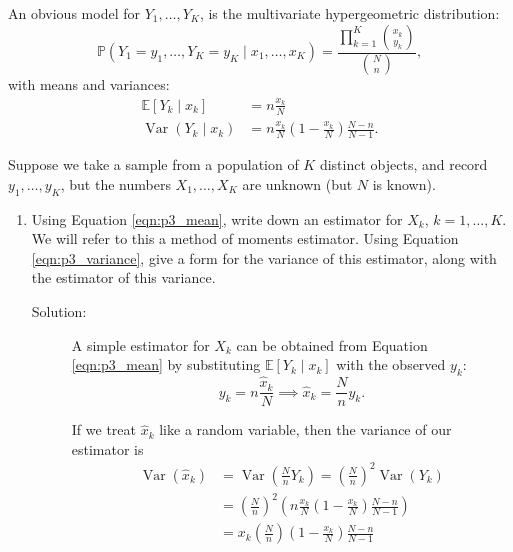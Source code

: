 \documentclass[letterpaper,11pt]{article}
\begin{document}
\begin{enumerate}
    An obvious model for $Y_1,\ldots,Y_K$, is the multivariate hypergeometric
    distribution:
    \begin{equation}
      \mathbb{P}\left(Y_1 = y_1,\ldots,Y_K=y_K \mid x_1,\ldots,x_K\right) =
      \frac{\prod_{k=1}^K{x_k \choose y_k}}{{N \choose n}},
      \label{eqn:p3_hypergeometric}
    \end{equation}
    with means and variances:
    \begin{align}
      \mathbb{E}\left[Y_k \mid x_k\right]
      &= n\frac{x_k}{N} \label{eqn:p3_mean}\\
      \operatorname{Var}\left(Y_k \mid x_k\right)
      &= n\frac{x_k}{N}\left(1 - \frac{x_k}{N}\right)\frac{N-n}{N-1}.
        \label{eqn:p3_variance}
    \end{align}

    Suppose we take a sample from a population of $K$ distinct objects, and
    record $y_1,\ldots,y_K$, but the numbers $X_1,\ldots,X_K$ are unknown (but
    $N$ is known).
    \begin{enumerate}
    \item Using Equation \ref{eqn:p3_mean}, write down an estimator for $X_k$,
      $k = 1,\ldots,K$. We will refer to this a method of moments
      estimator. Using Equation \ref{eqn:p3_variance}, give a form for the
      variance of this estimator, along with the estimator of this variance.

      \begin{description}
      \item[Solution:] A simple estimator for $X_k$ can be obtained from
        Equation \ref{eqn:p3_mean} by substituting
        $\mathbb{E}\left[Y_k \mid x_k\right]$ with the observed $y_k$:
        \begin{equation}
          y_k = n\frac{\hat{x}_k}{N} \implies \hat{x}_k = \frac{N}{n}y_k.
          \label{eqn:p3_xk_method_of_moments}
        \end{equation}

        If we treat $\hat{x}_k$ like a random variable, then the variance of our
        estimator is
        \begin{align}
          \operatorname{Var}\left(\hat{x}_k\right)
          &= \operatorname{Var}\left(\frac{N}{n}Y_k\right)
            = \left(\frac{N}{n}\right)^2
            \operatorname{Var}\left(Y_k\right)\nonumber\\
          &= \left(\frac{N}{n}\right)^2\left(
            n\frac{x_k}{N}\left(1 - \frac{x_k}{N}\right)\frac{N-n}{N-1}
            \right) \nonumber\\
          &= x_k\left(\frac{N}{n}\right)
            \left(1 - \frac{x_k}{N}\right)\frac{N-n}{N-1}
            \label{eqn:p3_xk_method_of_moments_variance}
        \end{align}


\end{description}
\end{enumerate}
\end{enumerate}
\end{document}
